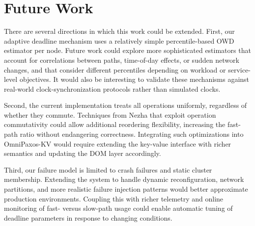 \documentclass{article}
\begin{document}
\begin{table}[h]
  \centering
  \small
  \caption{Side-by-side comparison of medium-quality clocks with fixed deadlines and adaptive deadlines based on per-replica OWD estimates.}
\end{table}

\section{Future Work}
There are several directions in which this work could be extended. First, our adaptive deadline mechanism uses a relatively simple percentile-based OWD estimator per node. Future work could explore more sophisticated estimators that account for correlations between paths, time-of-day effects, or sudden network changes, and that consider different percentiles depending on workload or service-level objectives. It would also be interesting to validate these mechanisms against real-world clock-synchronization protocols rather than simulated clocks.

Second, the current implementation treats all operations uniformly, regardless of whether they commute. Techniques from Nezha that exploit operation commutativity could allow additional reordering flexibility, increasing the fast-path ratio without endangering correctness. Integrating such optimizations into OmniPaxos-KV would require extending the key-value interface with richer semantics and updating the DOM layer accordingly.

Third, our failure model is limited to crash failures and static cluster membership. Extending the system to handle dynamic reconfiguration, network partitions, and more realistic failure injection patterns would better approximate production environments. Coupling this with richer telemetry and online monitoring of fast- versus slow-path usage could enable automatic tuning of deadline parameters in response to changing conditions.
\end{document}

